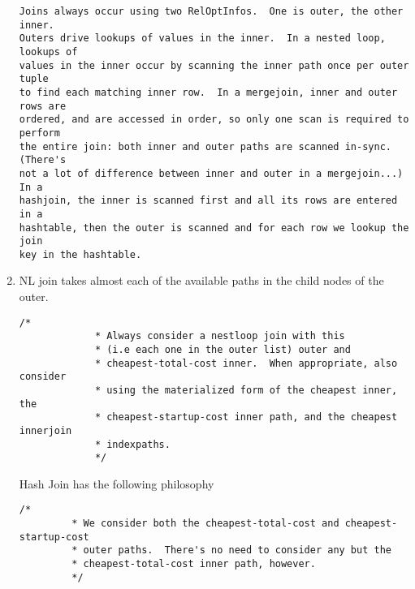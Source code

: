 \documentclass[10pt]{article}
\begin{document}
\begin{enumerate}
\begin{verbatim}
Joins always occur using two RelOptInfos.  One is outer, the other inner.
Outers drive lookups of values in the inner.  In a nested loop, lookups of
values in the inner occur by scanning the inner path once per outer tuple
to find each matching inner row.  In a mergejoin, inner and outer rows are
ordered, and are accessed in order, so only one scan is required to perform
the entire join: both inner and outer paths are scanned in-sync.  (There's
not a lot of difference between inner and outer in a mergejoin...)  In a
hashjoin, the inner is scanned first and all its rows are entered in a
hashtable, then the outer is scanned and for each row we lookup the join
key in the hashtable.
\end{verbatim}
\item NL join takes almost each of the available paths in the child nodes of the outer. 

\begin{verbatim}
/*
			 * Always consider a nestloop join with this
			 * (i.e each one in the outer list) outer and
			 * cheapest-total-cost inner.  When appropriate, also consider
			 * using the materialized form of the cheapest inner, the
			 * cheapest-startup-cost inner path, and the cheapest innerjoin
			 * indexpaths.
			 */
\end{verbatim}
Hash Join has the following philosophy
\begin{verbatim}
/*
		 * We consider both the cheapest-total-cost and cheapest-startup-cost
		 * outer paths.  There's no need to consider any but the
		 * cheapest-total-cost inner path, however.
		 */
\end{verbatim}





\end{enumerate}
\end{document}

